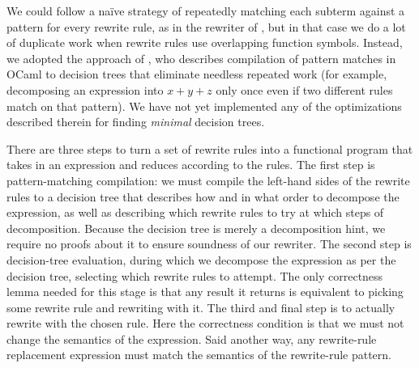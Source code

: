 We could follow a naïve strategy of repeatedly matching each subterm against a pattern for every rewrite rule, as in the rewriter of \textcite{rtac}, but in that case we do a lot of duplicate work when rewrite rules use overlapping function symbols.
Instead, we adopted the approach of \textcite{maranget2008compiling}, who describes compilation of pattern matches in OCaml to decision trees that eliminate needless repeated work (for example, decomposing an expression into $x + y + z$ only once even if two different rules match on that pattern).
We have not yet implemented any of the optimizations described therein for finding \emph{minimal} decision trees.

There are three steps to turn a set of rewrite rules into a functional program that takes in an expression and reduces according to the rules.
The first step is pattern-matching compilation: we must compile the left-hand sides of the rewrite rules to a decision tree that describes how and in what order to decompose the expression, as well as describing which rewrite rules to try at which steps of decomposition.
Because the decision tree is merely a decomposition hint, we require no proofs about it to ensure soundness of our rewriter.
The second step is decision-tree evaluation, during which we decompose the expression as per the decision tree, selecting which rewrite rules to attempt.
The only correctness lemma needed for this stage is that any result it returns is equivalent to picking some rewrite rule and rewriting with it.
The third and final step is to actually rewrite with the chosen rule.
Here the correctness condition is that we must not change the semantics of the expression.
Said another way, any rewrite-rule replacement expression must match the semantics of the rewrite-rule pattern.

